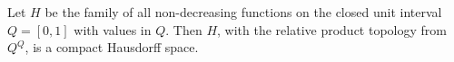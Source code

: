 Let $H$ be the family of all non-decreasing functions on the closed unit interval $Q = [0,1]$ with values in $Q$. Then $H$, with the relative product topology from $Q^Q$, is a compact Hausdorff space.
